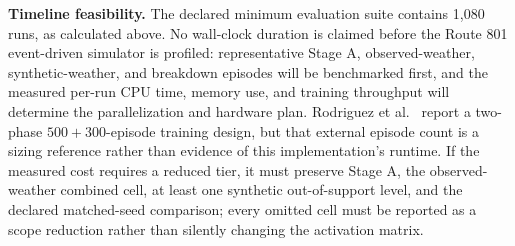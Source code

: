 \textbf{Timeline feasibility.} The declared minimum evaluation suite contains 1{,}080 runs, as calculated above. No wall-clock duration is claimed before the Route 801 event-driven simulator is profiled: representative Stage A, observed-weather, synthetic-weather, and breakdown episodes will be benchmarked first, and the measured per-run CPU time, memory use, and training throughput will determine the parallelization and hardware plan. Rodriguez et al.~\cite{Rodriguez2023Cooperative} report a two-phase $500+300$-episode training design, but that external episode count is a sizing reference rather than evidence of this implementation's runtime. If the measured cost requires a reduced tier, it must preserve Stage A, the observed-weather combined cell, at least one synthetic out-of-support level, and the declared matched-seed comparison; every omitted cell must be reported as a scope reduction rather than silently changing the activation matrix.
